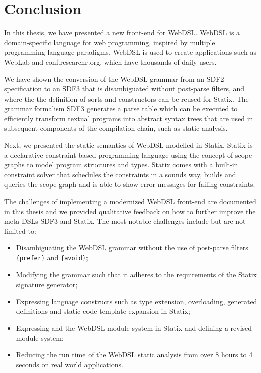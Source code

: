 
\chapter{\label{chap:conclusion}Conclusion}

  In this thesis, we have presented a new front-end for WebDSL. WebDSL is a domain-specific language for web programming, inspired by multiple programming language paradigms. WebDSL is used to create applications such as WebLab and conf.researchr.org, which have thousands of daily users.

  We have shown the conversion of the WebDSL grammar from an SDF2 specification to an SDF3 that is disambiguated without post-parse filters, and where the the definition of sorts and constructors can be reused for Statix. The grammar formalism SDF3 generates a parse table which can be executed to efficiently transform textual programs into abstract syntax trees that are used in subsequent components of the compilation chain, such as static analysis.

  Next, we presented the static semantics of WebDSL modelled in Statix. Statix is a declarative constraint-based programming language using the concept of scope graphs to model program structures and types. Statix comes with a built-in constraint solver that schedules the constraints in a sounds way, builds and queries the scope graph and is able to show error messages for failing constraints.

  The challenges of implementing a modernized WebDSL front-end are documented in this thesis and we provided qualitative feedback on how to further improve the meta-DSLs SDF3 and Statix. The most notable challenges include but are not limited to:
  
  \begin{itemize}
    \item Disambiguating the WebDSL grammar without the use of post-parse filters \texttt{\{prefer\}} and \texttt{\{avoid\}};
    \item Modifying the grammar such that it adheres to the requirements of the Statix signature generator;
    \item Expressing language constructs such as type extension, overloading, generated definitions and static code template expansion in Statix;
    \item Expressing and the WebDSL module system in Statix and defining a revised module system;
    \item Reducing the run time of the WebDSL static analysis from over 8 hours to 4 seconds on real world applications.
  \end{itemize}

